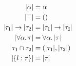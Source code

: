 
\begin{align*}
  \lvert \alpha \rvert                    &= \alpha \\
  \lvert \top \rvert                      &= () \\
  \lvert \tau_1 \rvert \to \lvert \tau_2 \rvert &= \lvert \tau_1 \rvert \to \lvert \tau_2 \rvert \\
  \lvert \forall \alpha.\, \tau \rvert        &= \forall \alpha.\, \lvert \tau \rvert \\
  \lvert \tau_1 \cap \tau_2 \rvert    &= (\lvert \tau_1 \rvert, \lvert \tau_2 \rvert) \\
  \lvert \{ l : \tau \} \rvert      &= \lvert \tau \rvert
\end{align*}